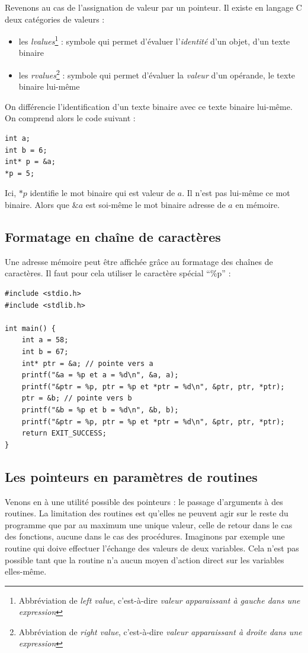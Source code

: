 \documentclass[../../../main.tex]{subfiles}
\begin{document}
Revenons au cas de l'assignation de valeur par un pointeur. Il existe en langage C deux catégories de valeurs :
\begin{itemize}
	\item les \textit{lvalues}\footnote{Abbréviation de \textit{left value}, c'est-à-dire \textit{valeur apparaissant à gauche dans une expression}} : symbole qui permet d'évaluer l'\textit{identité} d'un objet, d'un texte binaire
	\item les \textit{rvalues}\footnote{Abbréviation de \textit{right value}, c'est-à-dire \textit{valeur apparaissant à droite dans une expression}} : symbole qui permet d'évaluer la \textit{valeur} d'un opérande, le texte binaire lui-même
\end{itemize}
On différencie l'identification d'un texte binaire avec ce texte binaire lui-même. On comprend alors le code suivant :
\begin{verbatim}
int a;
int b = 6;
int* p = &a;
*p = 5;
\end{verbatim}
Ici, $*p$ identifie le mot binaire qui est valeur de $a$. Il n'est pas lui-même ce mot binaire. Alors que $\&a$ est soi-même le mot binaire adresse de $a$ en mémoire.

\subsection{Formatage en chaîne de caractères}
\label{sub:formatage_en_cha_ne_de_caract_res}
Une adresse mémoire peut être affichée grâce au formatage des chaînes de caractères. Il faut pour cela utiliser le caractère spécial ``\%p'' :
\begin{verbatim}
#include <stdio.h>
#include <stdlib.h>

int main() {
	int a = 58;
	int b = 67;
	int* ptr = &a; // pointe vers a
	printf("&a = %p et a = %d\n", &a, a);
	printf("&ptr = %p, ptr = %p et *ptr = %d\n", &ptr, ptr, *ptr);
	ptr = &b; // pointe vers b
	printf("&b = %p et b = %d\n", &b, b);
	printf("&ptr = %p, ptr = %p et *ptr = %d\n", &ptr, ptr, *ptr);
	return EXIT_SUCCESS;
}
\end{verbatim}
\subsection{Les pointeurs en paramètres de routines}
\label{sub:les_pointeurs_en_param_tres_de_routines}
Venons en à une utilité possible des pointeurs : le passage d'arguments à des routines. La limitation des routines est qu'elles ne peuvent agir sur le reste du programme que par au maximum une unique valeur, celle de retour dans le cas des fonctions, aucune dans le cas des procédures. Imaginons par exemple une routine qui doive effectuer l'échange des valeurs de deux variables. Cela n'est pas possible tant que la routine n'a aucun moyen d'action direct sur les variables elles-même.
\end{document}
